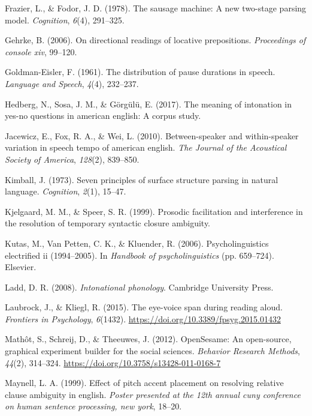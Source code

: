 \documentclass[11pt,oneside]{book}
\begin{document}
\leavevmode\hypertarget{ref-frazier1978sausage}{}%
Frazier, L., \& Fodor, J. D. (1978). The sausage machine: A new two-stage parsing model. \emph{Cognition}, \emph{6}(4), 291--325.

\leavevmode\hypertarget{ref-geh}{}%
Gehrke, B. (2006). On directional readings of locative prepositions. \emph{Proceedings of console xiv}, 99--120.

\leavevmode\hypertarget{ref-goldman1961-pa}{}%
Goldman-Eisler, F. (1961). The distribution of pause durations in speech. \emph{Language and Speech}, \emph{4}(4), 232--237.

\leavevmode\hypertarget{ref-Hedberg2017-er}{}%
Hedberg, N., Sosa, J. M., \& Görgülü, E. (2017). The meaning of intonation in yes-no questions in american english: A corpus study.

\leavevmode\hypertarget{ref-jacewicz2010-sr}{}%
Jacewicz, E., Fox, R. A., \& Wei, L. (2010). Between-speaker and within-speaker variation in speech tempo of american english. \emph{The Journal of the Acoustical Society of America}, \emph{128}(2), 839--850.

\leavevmode\hypertarget{ref-kimball1973seven}{}%
Kimball, J. (1973). Seven principles of surface structure parsing in natural language. \emph{Cognition}, \emph{2}(1), 15--47.

\leavevmode\hypertarget{ref-Kjelgaard1999-xd}{}%
Kjelgaard, M. M., \& Speer, S. R. (1999). Prosodic facilitation and interference in the resolution of temporary syntactic closure ambiguity.

\leavevmode\hypertarget{ref-n400}{}%
Kutas, M., Van Petten, C. K., \& Kluender, R. (2006). Psycholinguistics electrified ii (1994--2005). In \emph{Handbook of psycholinguistics} (pp. 659--724). Elsevier.

\leavevmode\hypertarget{ref-ladd}{}%
Ladd, D. R. (2008). \emph{Intonational phonology}. Cambridge University Press.

\leavevmode\hypertarget{ref-evs}{}%
Laubrock, J., \& Kliegl, R. (2015). The eye-voice span during reading aloud. \emph{Frontiers in Psychology}, \emph{6}(1432). \url{https://doi.org/10.3389/fpsyg.2015.01432}

\leavevmode\hypertarget{ref-os2012}{}%
Mathôt, S., Schreij, D., \& Theeuwes, J. (2012). OpenSesame: An open-source, graphical experiment builder for the social sciences. \emph{Behavior Research Methods}, \emph{44}(2), 314--324. \url{https://doi.org/10.3758/s13428-011-0168-7}

\leavevmode\hypertarget{ref-maynell1999effect}{}%
Maynell, L. A. (1999). Effect of pitch accent placement on resolving relative clause ambiguity in english. \emph{Poster presented at the 12th annual cuny conference on human sentence processing, new york}, 18--20.
\end{document}
